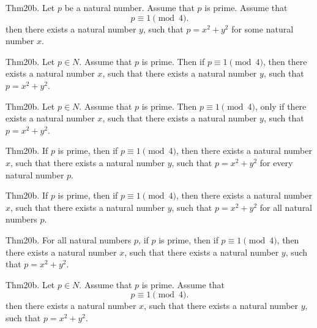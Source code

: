 \documentclass{article}
\begin{document}
Thm20b. Let $p$ be a natural number. Assume that $p$ is prime. Assume that $$p \equiv 1 \pmod{ 4}.$$ then there exists a natural number $y$, such that $p = x ^{ 2}+ y ^{ 2}$ for some natural number $x$.

Thm20b. Let $p \in N$. Assume that $p$ is prime. Then if $p \equiv 1 \pmod{ 4}$, then there exists a natural number $x$, such that there exists a natural number $y$, such that $p = x ^{ 2}+ y ^{ 2}$.

Thm20b. Let $p \in N$. Assume that $p$ is prime. Then $p \equiv 1 \pmod{ 4}$, only if there exists a natural number $x$, such that there exists a natural number $y$, such that $p = x ^{ 2}+ y ^{ 2}$.

Thm20b. If $p$ is prime, then if $p \equiv 1 \pmod{ 4}$, then there exists a natural number $x$, such that there exists a natural number $y$, such that $p = x ^{ 2}+ y ^{ 2}$ for every natural number $p$.

Thm20b. If $p$ is prime, then if $p \equiv 1 \pmod{ 4}$, then there exists a natural number $x$, such that there exists a natural number $y$, such that $p = x ^{ 2}+ y ^{ 2}$ for all natural numbers $p$.

Thm20b. For all natural numbers $p$, if $p$ is prime, then if $p \equiv 1 \pmod{ 4}$, then there exists a natural number $x$, such that there exists a natural number $y$, such that $p = x ^{ 2}+ y ^{ 2}$.

Thm20b. Let $p \in N$. Assume that $p$ is prime. Assume that $$p \equiv 1 \pmod{ 4}.$$ then there exists a natural number $x$, such that there exists a natural number $y$, such that $p = x ^{ 2}+ y ^{ 2}$.
\end{document}
